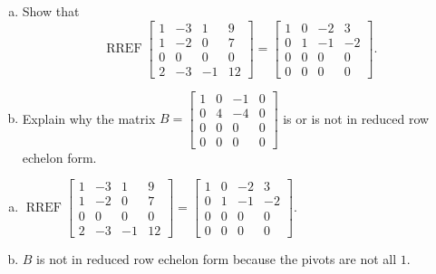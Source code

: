 
\begin{exerciseStatement}

\begin{enumerate}[(a)]
\item Show that \[\operatorname{RREF} \left[\begin{array}{cccc}
1 & -3 & 1 & 9 \\
1 & -2 & 0 & 7 \\
0 & 0 & 0 & 0 \\
2 & -3 & -1 & 12
\end{array}\right] = \left[\begin{array}{cccc}
1 & 0 & -2 & 3 \\
0 & 1 & -1 & -2 \\
0 & 0 & 0 & 0 \\
0 & 0 & 0 & 0
\end{array}\right] .\]
\item Explain why the matrix \(B= \left[\begin{array}{cccc}
1 & 0 & -1 & 0 \\
0 & 4 & -4 & 0 \\
0 & 0 & 0 & 0 \\
0 & 0 & 0 & 0
\end{array}\right] \) is or is not in reduced row echelon form.
\end{enumerate}
    
\end{exerciseStatement}
    
\begin{exerciseAnswer} 

\begin{enumerate}[(a)]
\item \(\operatorname{RREF} \left[\begin{array}{cccc}
1 & -3 & 1 & 9 \\
1 & -2 & 0 & 7 \\
0 & 0 & 0 & 0 \\
2 & -3 & -1 & 12
\end{array}\right] = \left[\begin{array}{cccc}
1 & 0 & -2 & 3 \\
0 & 1 & -1 & -2 \\
0 & 0 & 0 & 0 \\
0 & 0 & 0 & 0
\end{array}\right] .\)
\item \(B\) is not in reduced row echelon form because the pivots are not all \(1\). 
\end{enumerate}
    
\end{exerciseAnswer}
    
